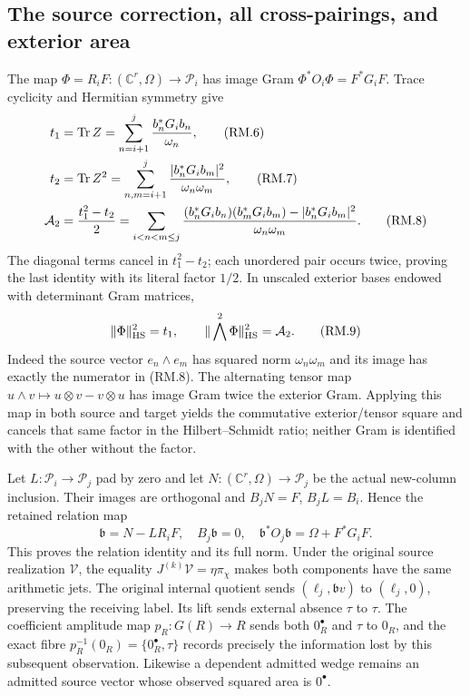 \subsection{The source correction, all cross-pairings, and exterior area}
The map $\Phi=R_iF:(\mathbb C^r,\Omega)\to\mathcal P_i$ has image Gram
$\Phi^*O_i\Phi=F^*G_iF$. Trace cyclicity and Hermitian symmetry give
\begin{align}
 t_1&=\operatorname{Tr} Z=\sum_{n=i+1}^j\frac{b_n^*G_ib_n}{\omega_n},\tag{RM.6}\\
 t_2&=\operatorname{Tr} Z^2=\sum_{n,m=i+1}^j
 \frac{|b_n^*G_ib_m|^2}{\omega_n\omega_m},\tag{RM.7}\\
 \mathcal A_2&=\frac{t_1^2-t_2}{2}
 =\sum_{i<n<m\le j}\frac{(b_n^*G_ib_n)(b_m^*G_ib_m)
 -|b_n^*G_ib_m|^2}{\omega_n\omega_m}.\tag{RM.8}
\end{align}
The diagonal terms cancel in $t_1^2-t_2$; each unordered pair occurs
twice, proving the last identity with its literal factor $1/2$.
In unscaled exterior bases endowed with determinant Gram matrices,
\begin{equation}
 \|\Phi\|_{\mathrm{HS}}^2=t_1,\qquad
 \|\bigwedge^2\Phi\|_{\mathrm{HS}}^2=\mathcal A_2.\tag{RM.9}
\end{equation}
Indeed the source vector $e_n\wedge e_m$ has squared norm
$\omega_n\omega_m$ and its image has exactly the numerator in (RM.8).
The alternating tensor map $u\wedge v\mapsto u\otimes v-v\otimes u$
has image Gram twice the exterior Gram. Applying this map in both source
and target yields the commutative exterior/tensor square and cancels that
same factor in the Hilbert--Schmidt ratio; neither Gram is identified
with the other without the factor.

Let $L:\mathcal P_i\to\mathcal P_j$ pad by zero and let
$N:(\mathbb C^r,\Omega)\to\mathcal P_j$ be the actual new-column
inclusion. Their images are orthogonal and $B_jN=F$, $B_jL=B_i$.
Hence the retained relation map
\begin{equation}
 \mathfrak b=N-LR_iF,\quad B_j\mathfrak b=0,\quad
 \mathfrak b^*O_j\mathfrak b=\Omega+F^*G_iF.\tag{RM.10}
\end{equation}
This proves the relation identity and its full norm. Under the original
source realization $\mathcal V$, the equality
$J^{(k)}\mathcal V=\eta\pi_\chi$ makes both components have the same
arithmetic jets. The original internal quotient sends
$(\ell_j,\mathfrak b v)$ to $(\ell_j,0)$, preserving the receiving
label. Its lift sends external absence $\tau$ to $\tau$. The coefficient
amplitude map $p_R:G(R)\to R$ sends both $0_R^\bullet$ and $\tau$ to
$0_R$, and the exact fibre $p_R^{-1}(0_R)=\{0_R^\bullet,\tau\}$
records precisely the information lost by this subsequent observation.
Likewise a dependent admitted wedge remains an admitted source vector
whose observed squared area is $0^\bullet$.

